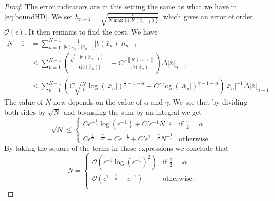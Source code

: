 \documentclass[a4paper, oneside, reqno]{amsart}
\newcommand{\abs}[1]{\left\lvert#1\right\rvert}
\newcommand{\norm}[1]{\left\|#1\right\|}
\theoremstyle{remark}
\begin{document}
\begin{proof}
    The error indicators are in this setting the same as what we have in \eqref{eq:boundHD}. We set \(h_{n-1} = \sqrt{\frac{\epsilon }{N\max\{1, b'(\bar x_{n-1})\}}}\), which gives an error of order \(\mathcal{O}(\epsilon)\). It then remains to find the cost. We have
    \begin{align*}
        N -1 &= \sum_{n = 1}^{N-1} \frac{1}{\abs{b(\bar x_{n})}h_{n-1}}\abs{b(\bar x_{n})}h_{n-1} \\
        &\leq \sum_{n=1}^{N-1} \left(\frac{\sqrt{\norm{b'(\bar x_{n-1})}}}{\epsilon\abs{b(\bar x_n)}} + C'\frac{\norm{b'(\bar x_{n})}}{\abs{b(\bar x_{n})}}\right)\Delta\abs{\bar x}_{n-1} \\
        &\leq \sum_{n=1}^{N-1} \left(C\sqrt{\frac{N}{\epsilon}}\log(\abs{\bar x_{n}})^{\frac{\gamma}{2}-1-\alpha} + C'\log(\abs{\bar x_{n}})^{\gamma-1-\alpha}\right)\abs{\bar x_{n}}^{-1}\Delta\abs{\bar x}_{n-1}. 
    \end{align*}
    The value of \(N\) now depends on the value of \(\alpha\) and \(\gamma\). We see that by dividing both sides by \(\sqrt{N}\) and bounding the sum by an integral we get
    \[\sqrt{N} \leq 
    \begin{cases}
        C\epsilon^{-\frac{1}{2}}\log(\epsilon^{-1}) + C'\epsilon^{-1}N^{-\frac{1}{2}} & \text{if } \frac{\gamma}{2} = \alpha \\
        C\epsilon^{\frac{1}{2} - \frac{\gamma}{2\alpha}} + C\epsilon^{-\frac{1}{2}} + C'\epsilon^{1 - \frac{\gamma}{\alpha}}N^{-\frac{1}{2}} & \text{otherwise}.
    \end{cases}\]
    By taking the square of the terms in these expressions we conclude that 
    \[N = 
    \begin{cases}
        \mathcal{O}(\epsilon^{-1}\log(\epsilon^{-1})^2) & \text{if } \frac{\gamma}{2} = \alpha \\
        \mathcal{O}(\epsilon^{1-\frac{\gamma}{\alpha}} + \epsilon^{-1}) & \text{otherwise}. \\
    \end{cases}\]
\end{proof}
\end{document}

